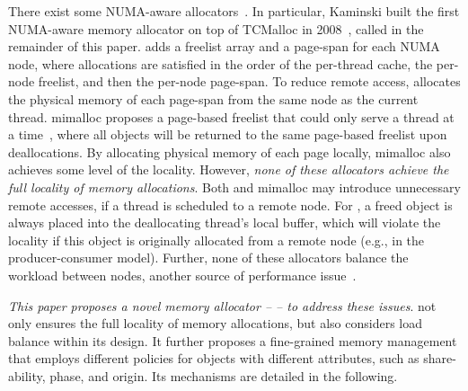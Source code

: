 There exist some NUMA-aware allocators~\cite{tcmallocnew, kim2013node, yang2019jarena, mimalloc}. In particular, Kaminski built the first NUMA-aware memory allocator on top of TCMalloc in 2008~\cite{tcmallocnew}, called \TN{} in the remainder of this paper. \TN{} adds a freelist array and a page-span for each NUMA node, where allocations are satisfied in the order of the per-thread cache, the per-node freelist, and then the per-node page-span. To reduce remote access, \TN{} allocates the physical memory of each page-span from the same node as the current thread. mimalloc proposes a page-based freelist that could only serve a thread at a time~\cite{mimalloc}, where all objects will be returned to the same page-based freelist upon deallocations. By allocating physical memory of each page locally, mimalloc also achieves some level of the locality. However, \textit{none of these allocators achieve the full locality of memory allocations}. Both \TN{} and mimalloc may introduce unnecessary remote accesses, if a thread is scheduled to a remote node. For \TN{}, a freed object is always placed into the deallocating thread's local buffer, which will violate the locality if this object is originally allocated from a remote node  (e.g., in the producer-consumer model). 
Further, none of these allocators balance the workload between nodes, another source of performance issue~\cite{Dashti:2013:TMH:2451116.2451157}. 



\textit{This paper proposes a novel memory allocator -- \NM{} -- to address these issues}.  \NM{} not only ensures the full locality of memory allocations, but also considers load balance within its design. It further proposes a fine-grained memory management that employs different policies for objects with different attributes, such as share-ability, phase, and origin. Its mechanisms are detailed in the following.   


